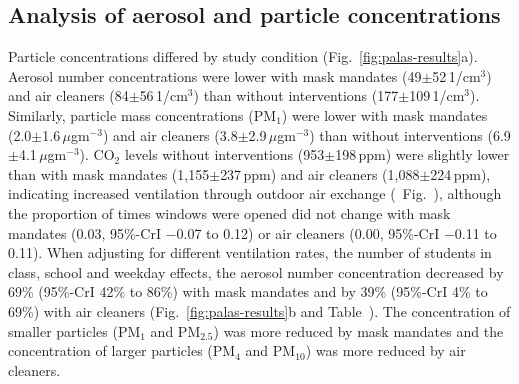 \documentclass[fleqn,11pt]{wlscirep}
\begin{document}
\subsection{Analysis of aerosol and particle concentrations}

Particle concentrations differed by study condition (Fig.~\ref{fig:palas-results}a). Aerosol number concentrations were lower with mask mandates (49$\pm$52\,1/cm$^3$) and air cleaners (84$\pm$56\,1/cm$^3$) than without interventions (177$\pm$109\,1/cm$^3$). Similarly, particle mass concentrations (\eg PM$_1$) were lower with mask mandates (2.0$\pm$1.6\,$\mu$gm$^{-3}$) and air cleaners (3.8$\pm$2.9\,$\mu$gm$^{-3}$) than without interventions (6.9$\pm$4.1\,$\mu$gm$^{-3}$). CO$_2$ levels without interventions (953$\pm$198\,ppm) were slightly lower than with mask mandates (1,155$\pm$237\,ppm) and air cleaners (1,088$\pm$224\,ppm), indicating increased ventilation through outdoor air exchange (\supp~Fig.~), although the proportion of times windows were opened did not change with mask mandates (0.03, 95\%-CrI $-$0.07 to 0.12) or air cleaners (0.00, 95\%-CrI $-$0.11 to 0.11). When adjusting for different ventilation rates, the number of students in class, school and weekday effects, the aerosol number concentration decreased by 69\% (95\%-CrI 42\% to 86\%) with mask mandates and by 39\% (95\%-CrI 4\% to 69\%) with air cleaners (Fig.~\ref{fig:palas-results}b and Table~). The concentration of smaller particles (PM$_1$ and PM$_{2.5}$) was more reduced by mask mandates and the concentration of larger particles (PM$_4$ and PM$_{10}$) was more reduced by air cleaners. 
\end{document}
